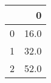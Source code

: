 \begin{tabular}{lr}
\toprule
{} &     0 \\
\midrule
0 &  16.0 \\
1 &  32.0 \\
2 &  52.0 \\
\bottomrule
\end{tabular}

